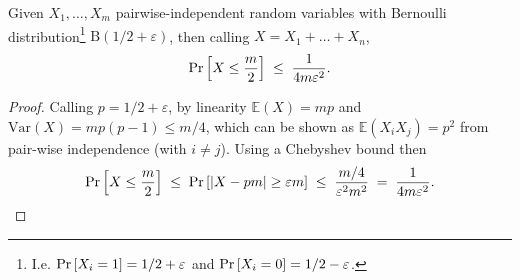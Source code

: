 \begin{lemma}
	Given $X_1, \ldots, X_m$ pairwise-independent random variables with Bernoulli distribution\footnote{I.e. $\Pr \left[ X_i = 1 \right] = 1/2 + \varepsilon$ and $\Pr \left[ X_i = 0 \right] = 1/2 - \varepsilon$.} $\mathrm{B}(1/2 + \varepsilon)$, then calling $X = X_1 + \ldots + X_n$,
	\[
		\Pr \left[ 
			X \leq \frac{m}{2}
		 \right]
			\; \leq \;
		\frac{1}{4m \varepsilon^2}.
	\]
\end{lemma}
\begin{proof}
	\label{lemm:GolLev89:majority_voting}
	Calling $p = 1/2 + \varepsilon$, by linearity $\mathbb{E}(X) = mp$ and $\mathrm{Var}(X) = m p(p - 1) \leq m/4$, which can be shown as $\mathbb{E}(X_i X_j) = p^2$ from pair-wise independence (with $i \neq j$).
	Using a Chebyshev bound then
	\[
		\Pr \left[ X \leq \frac{m}{2} \right]
			\; \leq \;
		\Pr \left[ \left| X - pm \right| \geq  \varepsilon m  \right]
			\; \leq \;
		\frac{m/4}{\varepsilon^2 m^2}
			\; = \;
		\frac{1}{4 m \varepsilon^2}.
	\]
\end{proof}

